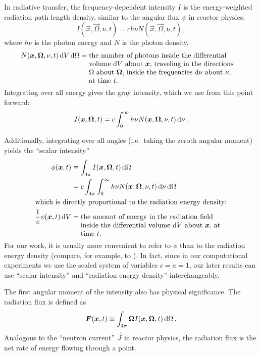 In radiative transfer, the frequency-dependent intensity $I$ is the
energy-weighted radiation path
length density, similar to the angular flux $\psi$ in reactor physics:
\begin{equation*}
  I(\vec{x},\vec{\Omega},\nu, t) = c h\nu N(\vec{x},\vec{\Omega},\nu, t)\,,
\end{equation*}
where $h\nu$ is the photon energy and $N$ is the photon density,
\begin{align*}
  N(\vec{x},\vec{\Omega}, \nu, t) \ud V \ud \Omega
  &= \topbox{the number of photons inside the differential volume $\ud V$
  about $\vec{x}$, traveling in the directions $\Omega$ about
  $\vec{\Omega}$, inside the frequencies $\ud \nu$ about $\nu$, at time $t$.}
\end{align*}
Integrating over all energy gives the gray intensity, which we use from this point forward:
\begin{equation*}
  I(\bm{x},\bm{\Omega}, t)
  = c \int_0^\infty h\nu N(\bm{x},\bm{\Omega},\nu, t) \mathop{}\!\mathrm{d}\nu \,.
\end{equation*}

Additionally, integrating over all angles (i.e.~taking the zeroth angular
moment) yields the ``scalar intensity''
\begin{align} \label{eq:intensityZeroth}
  \phi(\vec{x},t) &\equiv \int_{4\pi} I(\vec{x},\vec{\Omega}, t) \ud \Omega
  \\
  &= c \int_{4\pi} \int_0^\infty h\nu N(\vec{x},\vec{\Omega},\nu, t) \ud\nu
   \ud \Omega
\\ \intertext{which is directly proportional to the radiation energy density:}
\nonumber
\frac{1}{c} \phi(\vec{x},t) \ud V
&= \topbox{the amount of energy in the radiation field inside the differential
  volume $\ud V$ about $\vec{x}$, at time $t$.}
\end{align}
For our work, it is usually more convenient to refer to $\phi$ than to the
radiation energy density (compare, for example, \cite{Den2007} to
\cite{Kno1999a}). In fact, since in our computational experiments we use the
scaled system of variables $c=a=1$, our later results can use ``scalar
intensity'' and ``radiation energy density'' interchangeably.

The first angular moment of the intensity also has physical significance. The
radiation flux is defined as
\begin{equation} \label{eq:intensityFirst}
  \bm{F}(\bm{x},t) \equiv \int_{4\pi} \bm{\Omega}
  I(\bm{x},\bm{\Omega}, t) \mathop{}\!\mathrm{d} \Omega \,.
\end{equation}
Analogous to the ``neutron current'' $\vec{J}$ in reactor physics, the
radiation flux is the net rate of energy flowing through a point.

